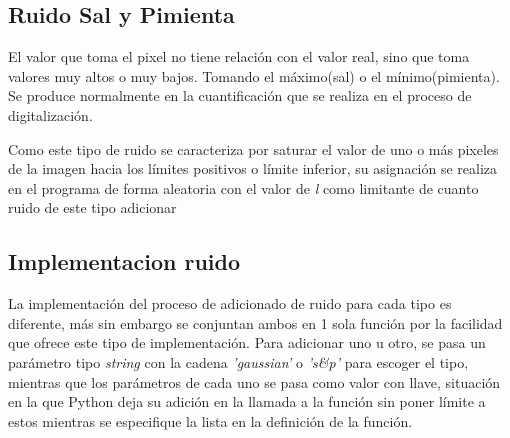 \subsection*{Ruido Sal y Pimienta}
	\hfill\break
	\justifying
	El valor que toma el pixel no tiene relación con el valor real, sino que toma valores muy altos o muy bajos. Tomando el máximo(sal) o el mínimo(pimienta). Se produce normalmente en la cuantificación que se realiza en el proceso de digitalización.
	
	\hfill\break
	\justifying
	Como este tipo de ruido se caracteriza por saturar el valor de uno o más pixeles de la imagen hacia los límites positivos o límite inferior, su asignación se realiza en el programa de forma aleatoria con el valor de \textit{l} como limitante de cuanto ruido de este tipo adicionar

\subsection*{Implementacion ruido}
\hfill\break
\justifying
La implementación del proceso de adicionado de ruido para cada tipo es diferente, más sin embargo se conjuntan ambos en 1 sola función por la facilidad que ofrece este tipo de implementación. Para adicionar uno u otro, se pasa un parámetro tipo \textit{string} con la cadena \textit{'gaussian'} o \textit{'s\&p'} para escoger el tipo, mientras que los parámetros de cada uno se pasa como valor con llave, situación en la que Python deja su adición en la llamada a la función sin poner límite a estos mientras se especifique la lista en la definición de la función.

\newpage

